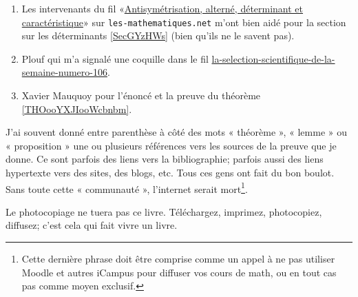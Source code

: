 \begin{description}
\begin{enumerate}
    \item
        Les intervenants du fil «\href{http://www.les-mathematiques.net/phorum/read.php?2,302266}{Antisymétrisation, alterné, déterminant et caractéristique}» sur \texttt{les-mathematiques.net} m'ont bien aidé pour la section sur les déterminants \ref{SecGYzHWs} (bien qu'ils ne le savent pas).
    \item
        Plouf qui m'a signalé une coquille dans le fil \href{http://passeurdesciences.blog.lemonde.fr/2014/01/24/la-selection-scientifique-de-la-semaine-numero-106}{la-selection-scientifique-de-la-semaine-numero-106}.
    \item
        Xavier Mauquoy pour l'énoncé et la preuve du théorème \ref{THOooYXJIooWcbnbm}.
\end{enumerate}
\end{description}


J'ai souvent donné entre parenthèse à côté des mots « théorème », « lemme » ou « proposition » une ou plusieurs références vers les sources de la preuve que je donne. Ce sont parfois des liens vers la bibliographie; parfois aussi des liens hypertexte vers des sites, des blogs, etc. Tous ces gens ont fait du bon boulot. Sans toute cette « communauté », l'internet serait mort\footnote{Cette dernière phrase doit être comprise comme un appel à ne pas utiliser Moodle et autres iCampus pour diffuser vos cours de math, ou en tout cas pas comme moyen exclusif.}.

\begin{center}
Le photocopiage ne tuera pas ce livre. Téléchargez, imprimez, photocopiez, diffusez; c'est cela qui fait vivre un livre.
\end{center}

